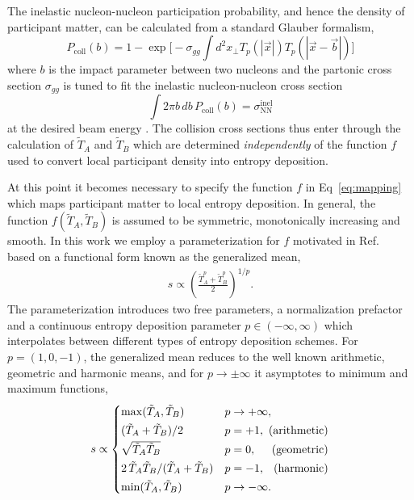 \documentclass[aps,prc,reprint,amsmath,nofootinbib,superscriptaddress]{revtex4-1}
\newcommand{\T}{\tilde{T}}
\begin{document}
The inelastic nucleon-nucleon participation probability, and hence the density of participant matter, can be calculated from a standard Glauber formalism,
\begin{equation}
  P_\text{coll}(b) =
    1 - \exp\biggl[
      -\sigma_{gg} \int d^2x_\perp T_p(|\vec{x}|) T_p(|\vec{x} - \vec{b}|)
    \biggr]
\end{equation}
where $b$ is the impact parameter between two nucleons and the partonic cross section $\sigma_{gg}$ is tuned to fit the inelastic nucleon-nucleon cross section
\begin{equation}
  \int 2 \pi b\, db\, P_\text{coll}(b) = \sigma_\text{NN}^\text{inel}
\end{equation}
at the desired beam energy \cite{?}.
The collision cross sections thus enter through the calculation of $\T_A$ and $\T_B$ which are determined \emph{independently} of the function $f$ used to convert local participant density into entropy deposition.

At this point it becomes necessary to specify the function $f$ in Eq~\eqref{eq:mapping} which maps participant matter to local entropy deposition.
In general, the function $f(\T_A, \T_B)$ is assumed to be symmetric, monotonically increasing and smooth.
In this work we employ a parameterization for $f$ motivated in Ref.~\cite{Moreland:2014oya} based on a functional form known as the generalized mean,
\begin{align}
  s \propto \left( \frac{\T_A^p + \T_B^p}{2} \right)^{1/p}.
  \label{eq:genmean}
\end{align}
The parameterization introduces two free parameters, a normalization prefactor and a continuous entropy deposition parameter $p\in(-\infty, \infty)$ which interpolates between different types of entropy deposition schemes.
For ${p=(1, 0, -1)}$, the generalized mean reduces to the well known arithmetic, geometric and harmonic means, and for $p\rightarrow \pm\infty$ it asymptotes to minimum and maximum functions,
\begin{equation}
  \newlength{\extraspace}
  \setlength{\extraspace}{0.5ex}
  s \propto
  \begin{cases}
    \max(\T_A, \T_B) & p \rightarrow +\infty, \\[\extraspace]
    (\T_A + \T_B)/2 & p = +1, \hfill \text{ (arithmetic)} \\[\extraspace]
    \sqrt{\T_A \T_B} & p = 0, \hfill \text{ (geometric)} \\[\extraspace]
    2\, \T_A \T_B/(\T_A + \T_B) & p = -1, \hfill \text{ (harmonic)} \\[\extraspace]
    \min(\T_A, \T_B) & p \rightarrow -\infty.
  \end{cases}
  \label{eq:means}
\end{equation}
\end{document}
